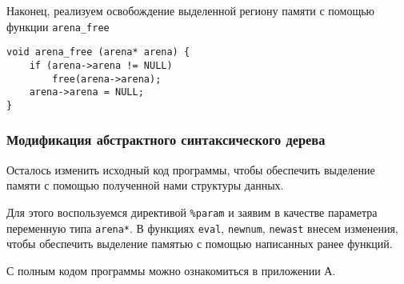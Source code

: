 Наконец, реализуем освобождение выделенной региону памяти с помощью функции
\verb|arena_free|

\begin{verbatim}
void arena_free (arena* arena) { 
    if (arena->arena != NULL) 
        free(arena->arena);
    arena->arena = NULL; 
}
\end{verbatim}

\subsubsection{Модификация абстрактного синтаксического дерева}
Осталось изменить исходный код программы, чтобы обеспечить выделение памяти с
помощью полученной нами структуры данных.

Для этого воспользуемся директивой \verb|%param| и заявим в качестве параметра
переменную типа \verb|arena*|. В функциях \verb|eval|, \verb|newnum|,
\verb|newast| внесем изменения, чтобы обеспечить выделение памятью с помощью
написанных ранее функций.

С полным кодом программы можно ознакомиться в приложении А.